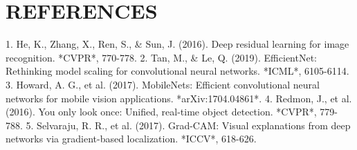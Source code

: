 \documentclass[journal,10pt]{IEEEtran}
\begin{document}
\section{REFERENCES}
1. He, K., Zhang, X., Ren, S., & Sun, J. (2016). Deep residual learning for image recognition. *CVPR*, 770-778.
2. Tan, M., & Le, Q. (2019). EfficientNet: Rethinking model scaling for convolutional neural networks. *ICML*, 6105-6114.
3. Howard, A. G., et al. (2017). MobileNets: Efficient convolutional neural networks for mobile vision applications. *arXiv:1704.04861*.
4. Redmon, J., et al. (2016). You only look once: Unified, real-time object detection. *CVPR*, 779-788.
5. Selvaraju, R. R., et al. (2017). Grad-CAM: Visual explanations from deep networks via gradient-based localization. *ICCV*, 618-626.
\end{document}
